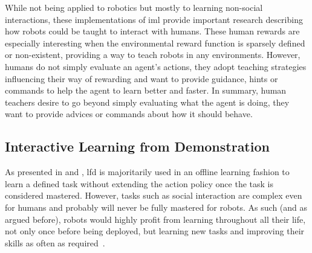 
While not being applied to robotics but mostly to learning non-social interactions, these implementations of \gls{iml} provide important research describing how robots could be taught to interact with humans. These human rewards are especially interesting when the environmental reward function is sparsely defined or non-existent, providing a way to teach robots in any environments. However, humans do not simply evaluate an agent's actions, they adopt teaching strategies influencing their way of rewarding and want to provide guidance, hints or commands to help the agent to learn better and faster. In summary, human teachers desire to go beyond simply evaluating what the agent is doing, they want to provide advices or commands about how it should behave.


\subsection{Interactive Learning from Demonstration} \label{ssec:back_ilfd}

As presented in \cite{argall2009survey} and \cite{billard2008robot}, \gls{lfd} is majoritarily used in an offline learning fashion to learn a defined task without extending the action policy once the task is considered mastered. However, tasks such as social interaction are complex even for humans and probably will never be fully mastered for robots. As such (and as argued before), robots would highly profit from learning throughout all their life, not only once before being deployed, but learning new tasks and improving their skills as often as required~\citep{dautenhahn2004robots}.

